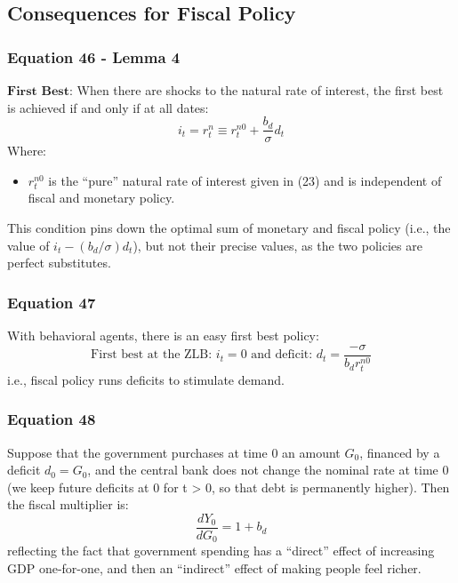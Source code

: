 \documentclass{article}
\begin{document}
\subsection{Consequences for Fiscal Policy}

\subsubsection*{Equation 46 - Lemma 4}
$\textbf{First Best}$: When there are shocks to the natural rate of interest, the first best is achieved if and only if at all dates:
\begin{equation}\tag{46}
    i_{t}=r_{t}^{n}\equiv r_{t}^{n0}+\frac{b_{d}}{\sigma}d_{t}
\end{equation}
Where:
\begin{itemize}
    \item $r_{t}^{n0}$ is the “pure” natural rate of interest given in (23) and is independent of fiscal and monetary policy.
\end{itemize}
This condition pins down the optimal sum of monetary
and fiscal policy (i.e., the value of $i_{t}-(b_{d}/\sigma)d_{t}$), but not their precise values, as the two policies are perfect substitutes.

\subsubsection*{Equation 47}
With behavioral agents, there is an easy first best policy:
\begin{equation}\tag{47}
    \text{First best at the ZLB: } i_{t}=0 \text{ and deficit: } d_{t}=\frac{-\sigma}{b_{d}r_{t}^{n0}}
\end{equation}
i.e., fiscal policy runs deficits to stimulate demand.

\subsubsection*{Equation 48}
Suppose that the government purchases at time 0 an amount $G_{0}$, financed by a deficit $d_{0}=G_{0}$, and the central bank does not change the nominal
rate at time 0 (we keep future deficits at 0 for t > 0, so that debt is permanently higher). Then the fiscal multiplier is:
\begin{equation}\tag{48}
    \frac{d Y_{0}}{d G_{0}}=1+b_{d}
\end{equation}
reflecting the fact that government spending has a “direct” effect of increasing GDP one-for-one, and then an “indirect” effect of making people feel richer.
\end{document}
